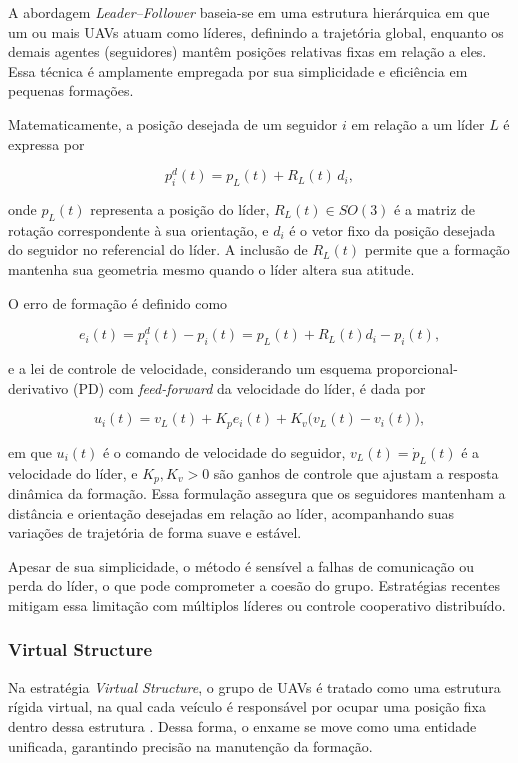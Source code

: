 \documentclass[portuguese]{sbcreviews-2025}%
\begin{document}
A abordagem \textit{Leader–Follower} baseia-se em uma estrutura hierárquica em que um ou mais UAVs atuam como líderes, definindo a trajetória global, enquanto os demais agentes (seguidores) mantêm posições relativas fixas em relação a eles. Essa técnica é amplamente empregada por sua simplicidade e eficiência em pequenas formações.

Matematicamente, a posição desejada de um seguidor $i$ em relação a um líder $L$ é expressa por

\[
p_i^{d}(t) = p_L(t) + R_L(t) \, d_i,
\]

onde $p_L(t)$ representa a posição do líder, $R_L(t) \in SO(3)$ é a matriz de rotação correspondente à sua orientação, e $d_i$ é o vetor fixo da posição desejada do seguidor no referencial do líder. A inclusão de $R_L(t)$ permite que a formação mantenha sua geometria mesmo quando o líder altera sua atitude.

O erro de formação é definido como

\[
e_i(t) = p_i^{d}(t) - p_i(t) = p_L(t) + R_L(t)d_i - p_i(t),
\]

e a lei de controle de velocidade, considerando um esquema proporcional-derivativo (PD) com \textit{feed-forward} da velocidade do líder, é dada por

\[
u_i(t) = v_L(t) + K_p e_i(t) + K_v \big(v_L(t) - v_i(t)\big),
\]

em que $u_i(t)$ é o comando de velocidade do seguidor, $v_L(t) = \dot{p}_L(t)$ é a velocidade do líder, e $K_p, K_v > 0$ são ganhos de controle que ajustam a resposta dinâmica da formação. Essa formulação assegura que os seguidores mantenham a distância e orientação desejadas em relação ao líder, acompanhando suas variações de trajetória de forma suave e estável.

Apesar de sua simplicidade, o método é sensível a falhas de comunicação ou perda do líder, o que pode comprometer a coesão do grupo. Estratégias recentes mitigam essa limitação com múltiplos líderes ou controle cooperativo distribuído.


\subsubsection{Virtual Structure}

Na estratégia \textit{Virtual Structure}, o grupo de UAVs é tratado como uma estrutura rígida virtual, na qual cada veículo é responsável por ocupar uma posição fixa dentro dessa estrutura \cite{bu2024advancement}. Dessa forma, o enxame se move como uma entidade unificada, garantindo precisão na manutenção da formação.
\end{document}
